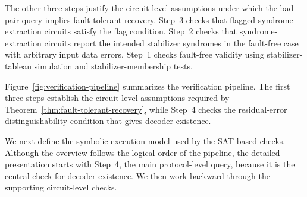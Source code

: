 \documentclass[acmsmall,screen,review,anonymous,nonacm]{acmart}
\begin{document}
The other three steps justify the circuit-level assumptions under which the bad-pair query implies fault-tolerant recovery. Step~3 checks that flagged syndrome-extraction circuits satisfy the flag condition. Step~2 checks that syndrome-extraction circuits report the intended stabilizer syndromes in the fault-free case with arbitrary input data errors. Step~1 checks fault-free validity using stabilizer-tableau simulation and stabilizer-membership tests.

Figure~\ref{fig:verification-pipeline} summarizes the verification pipeline. The first three steps establish the circuit-level assumptions required by Theorem~\ref{thm:fault-tolerant-recovery}, while Step~4 checks the residual-error distinguishability condition that gives decoder existence.

We next define the symbolic execution model used by the SAT-based checks. Although the overview follows the logical order of the pipeline, the detailed presentation starts with Step~4, the main protocol-level query, because it is the central check for decoder existence. We then work backward through the supporting circuit-level checks.
\end{document}
